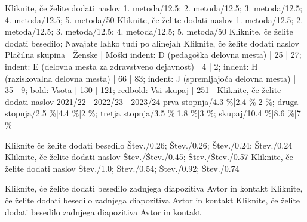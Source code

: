 \documentclass[aspectratio=169]{beamer}
\begin{document}
\ULFEPieChartSlide
  {Kliknite, če želite dodati naslov}
  {1. metoda/12.5; 2. metoda/12.5; 3. metoda/12.5; 4. metoda/12.5; 5. metoda/50}
\ULFEPieChartBulletsSlide
  {Kliknite, če želite dodati naslov}
  {1. metoda/12.5; 2. metoda/12.5; 3. metoda/12.5; 4. metoda/12.5; 5. metoda/50}
  {Kliknite, če želite dodati besedilo; Navajate lahko tudi po alinejah}
\ULFEDataTableSlide
  {Kliknite, če želite dodati naslov}
  {Plačilna skupina | Ženske | Moški}
  {indent: D (pedagoška delovna mesta) | 25 | 27;
   indent: E (delovna mesta za zdravstveno dejavnost) | 4 | 2;
   indent: H (raziskovalna delovna mesta) | 66 | 83;
   indent: J (spremljajoča delovna mesta) | 35 | 9;
   bold: Vsota | 130 | 121;
   redbold: Vsi skupaj | 251 |}
\ULFEGroupedBarChartSlide
  {Kliknite, če želite dodati naslov}
  {2021/22 | 2022/23 | 2023/24}
  {prva stopnja/4.3 \%|2.4 \%|2 \%;
   druga stopnja/2.5 \%|4.4 \%|2 \%;
   tretja stopnja/3.5 \%|1.8 \%|3 \%;
   skupaj/10.4 \%|8.6 \%|7 \%}

\ULFEMetricPairSlide
\ULFEMetricTripleSlide
\ULFEMetricQuadSlide

\ULFEAreaBlocksSlide
  {Kliknite če želite dodati besedilo}
  {Štev./0.26; Štev./0.26; Štev./0.24; Štev./0.24}
\ULFESplitRowsSlide
  {Kliknite, če želite dodati naslov}
  {Štev./Štev./0.45; Štev./Štev./0.57}
\ULFEVerticalBarsSlide
  {Kliknite, če želite dodati naslov}
  {Štev./1.0; Štev./0.54; Štev./0.92; Štev./0.74}

\ULFEWhiteLayout

\ULFEFinalGraySlide
  {Kliknite, če želite dodati besedilo zadnjega diapozitiva}
  {Avtor in kontakt}
\ULFEFinalRedSlide
  {Kliknite, če želite dodati besedilo zadnjega diapozitiva}
  {Avtor in kontakt}
\ULFEFinalPhotoSlide
  {Kliknite, če želite dodati besedilo zadnjega diapozitiva}
  {Avtor in kontakt}
\end{document}
